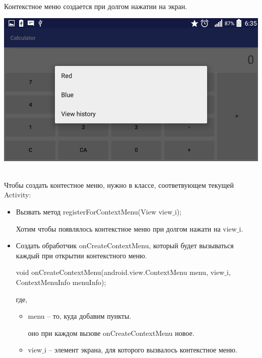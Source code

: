 
\\

    Контекстное меню создается при долгом нажатии на экран.

    \includegraphics[scale=0.3]{06-context-menus/Screenshot.png}
    
\\

    Чтобы создать контестное меню, нужно в классе, соответвующем текущей Activity: 
    
    \begin{itemize}
        \item Вызвать метод registerForContextMenu(View view$\_$i);
    
        Хотим чтобы появлялось контекстное меню при долгом нажати на view$\_$i.
    
        \item Создать обработчик onCreateContextMenu, который будет вызываться каждый при открытии контекстного меню.
    
        void onCreateContextMenu(android.view.ContextMenu menu, view$\_$i, ContextMenuInfo menuInfo);
        
        где, 
        \begin{itemize}
            \item menu -- то, куда добавим пункты.
            
            оно при каждом вызове onCreateContextMenu новое. 
    
            \item view$\_$i -- элемент экрана, для которого вызвалось контекстное меню.
        \end{itemize}
    \end{itemize}

